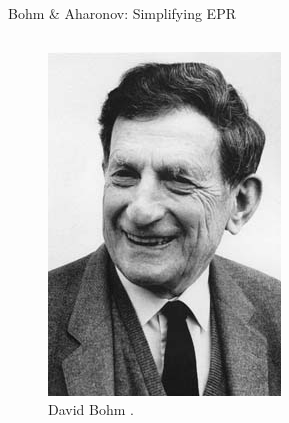 \begin{frame}{Bohm \& Aharonov: Simplifying EPR}
\begin{columns}[T]
    \begin{column}{0.4\textwidth}
      \begin{figure}
        \centering
        \includegraphics[width=\linewidth, height=0.7\textheight, keepaspectratio]{images/David_Bohm.jpg}
        \caption{David Bohm \cite{fotografo_desconocido_fotografidavid_nodate}.}
      \end{figure}
    \end{column}
  \end{columns}
\end{frame}

